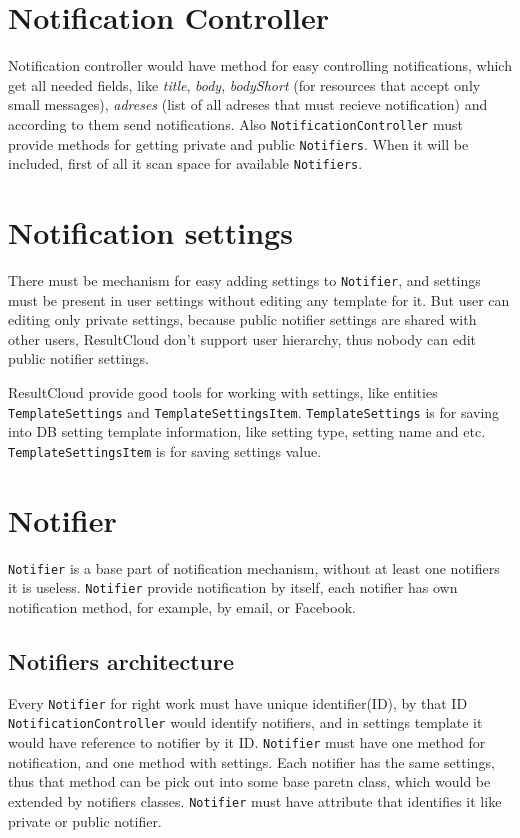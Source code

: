 \section{Notification Controller}

Notification controller would have method for easy controlling notifications, which get all needed fields, like \emph{title}, \emph{body}, \emph{bodyShort} (for resources that accept only small messages), \emph{adreses} (list of all adreses that must recieve notification) and according to them send notifications. Also \texttt{NotificationController} must provide methods for getting private and public \texttt{Notifiers}. When it will be included, first of all it scan space for available \texttt{Notifiers}.

\section{Notification settings}

There must be mechanism for easy adding settings to \texttt{Notifier}, and settings must be present in user settings without editing any template for it. But user can editing only private settings, because public notifier settings are shared with other users, ResultCloud don't support user hierarchy, thus nobody can edit public notifier settings.

ResultCloud provide good tools for working with settings, like entities \texttt{TemplateSettings} and \texttt{TemplateSettingsItem}. \texttt{TemplateSettings} is for saving into DB setting template information, like setting type, setting name and etc. \texttt{TemplateSettingsItem} is for saving settings value.

\section{Notifier}

\texttt{Notifier} is a base part of notification mechanism, without at least one notifiers it is useless. \texttt{Notifier} provide notification by itself, each notifier has own notification method, for example, by email, or Facebook.

\subsection{Notifiers architecture}

Every \texttt{Notifier} for right work must have unique identifier(ID), by that ID \texttt{NotificationController} would identify notifiers, and in settings template it would have reference to notifier by it ID. \texttt{Notifier} must have one method for notification, and one method with settings. Each notifier has the same settings, thus that method can be pick out into some base paretn class, which would be extended by notifiers classes. \texttt{Notifier} must have attribute that identifies it like private or public notifier.

